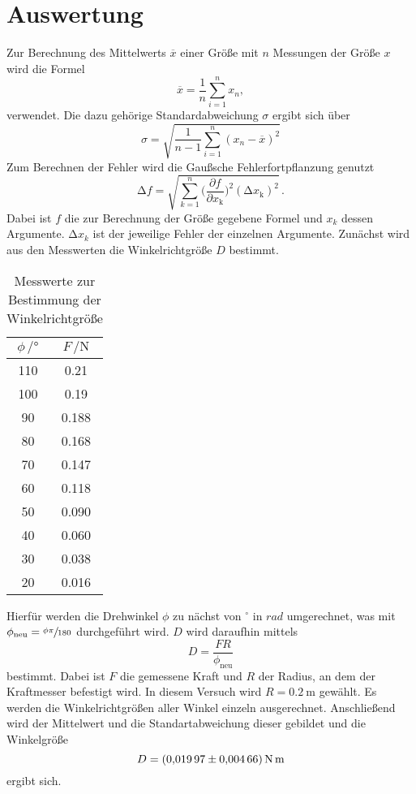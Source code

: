 \section{Auswertung}
\label{sec:Auswertung}
Zur Berechnung des Mittelwerts $\overline{x}$ einer Größe mit $n$ Messungen der Größe $x$ wird die Formel 
\begin{equation}
  \overline{x}=\frac{1}{n}\sum_{i=1}^n x_n,
  \label{eq:Mittelwert}
\end{equation} verwendet.
Die dazu gehörige Standardabweichung $\sigma$ ergibt sich über 
\begin{equation}
  \sigma=\sqrt{\frac{1}{n-1}\sum_{i=1}^n(x_n-\overline{x})^2}
  \label{eq:Standardabweichung}
\end{equation}
Zum Berechnen der Fehler wird die Gaußsche Fehlerfortpflanzung genutzt 
\begin{equation}
\increment f=\sqrt{\sum_{k=1}^{n}\biggl(\frac{\partial f}{\partial x_\text{k}}\biggr)^2(\increment x_\text{k})^2}\,.
\label{eq:gauss}
\end{equation}
Dabei ist $f$ die zur Berechnung der Größe gegebene Formel und $x_k$ dessen Argumente.
$\increment x_k$ ist der jeweilige Fehler der einzelnen Argumente.
Zunächst wird aus den Messwerten die Winkelrichtgröße $D$ bestimmt.
\begin{table}[H]
  \centering
  \caption{Messwerte zur Bestimmung der Winkelrichtgröße}
  \label{tab:Winkelrichtgroesse}
  \begin{tabular}{
  c c
  }
    \toprule
     $\phi \, / \unit{°}$ & $F\, / \unit{\newton}$\\
    \midrule
    110 & 0.21 \\
    100 & 0.19 \\
    90  & 0.188\\
    80  & 0.168\\
    70  & 0.147\\
    60  & 0.118\\
    50  & 0.090\\
    40  & 0.060\\
    30  & 0.038\\
    20  & 0.016\\
    \bottomrule
  \end{tabular}
\end{table}
Hierfür werden die Drehwinkel $\phi$ zu nächst von $^\circ$ in $rad$ umgerechnet, 
was mit $\phi_\text{neu} = \sfrac{\phi \pi}{180}$ durchgeführt wird.
$D$ wird daraufhin mittels
\begin{equation}
  D = \frac{F R}{\phi_\text{neu}}
\end{equation}
bestimmt.
Dabei ist $F$ die gemessene Kraft und $R$ der Radius, an dem der Kraftmesser befestigt wird.
In diesem Versuch wird $R = \SI{0.2}{\meter}$ gewählt.
Es werden die Winkelrichtgrößen aller Winkel einzeln ausgerechnet.
Anschließend wird der Mittelwert und die Standartabweichung dieser gebildet und die Winkelgröße
\begin{equation*}
  D = \SI{0.01997 \pm 0.00466}{\N \meter}
\end{equation*}
ergibt sich.

